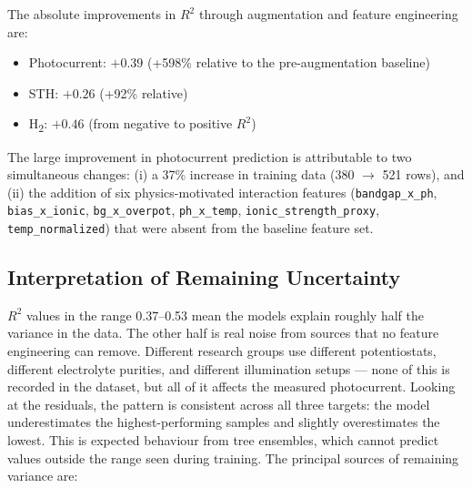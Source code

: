 The absolute improvements in $R^2$ through augmentation and feature engineering are:

\begin{itemize}
  \item Photocurrent: $+0.39$ (+598\% relative to the pre-augmentation baseline)
  \item STH: $+0.26$ (+92\% relative)
  \item H\textsubscript{2}: $+0.46$ (from negative to positive $R^2$)
\end{itemize}

The large improvement in photocurrent prediction is attributable to two
simultaneous changes: (i) a 37\% increase in training data (380 $\to$ 521 rows),
and (ii) the addition of six physics-motivated interaction features
(\texttt{bandgap\_x\_ph}, \texttt{bias\_x\_ionic}, \texttt{bg\_x\_overpot},
\texttt{ph\_x\_temp}, \texttt{ionic\_strength\_proxy}, \texttt{temp\_normalized})
that were absent from the baseline feature set.

\subsection{Interpretation of Remaining Uncertainty}

$R^2$ values in the range 0.37--0.53 mean the models explain roughly half the
variance in the data.
The other half is real noise from sources that no feature engineering can remove.
Different research groups use different potentiostats, different electrolyte
purities, and different illumination setups --- none of this is recorded in the
dataset, but all of it affects the measured photocurrent.
Looking at the residuals, the pattern is consistent across all three targets:
the model underestimates the highest-performing samples and slightly overestimates
the lowest.
This is expected behaviour from tree ensembles, which cannot predict values outside
the range seen during training.
The principal sources of remaining variance are:


